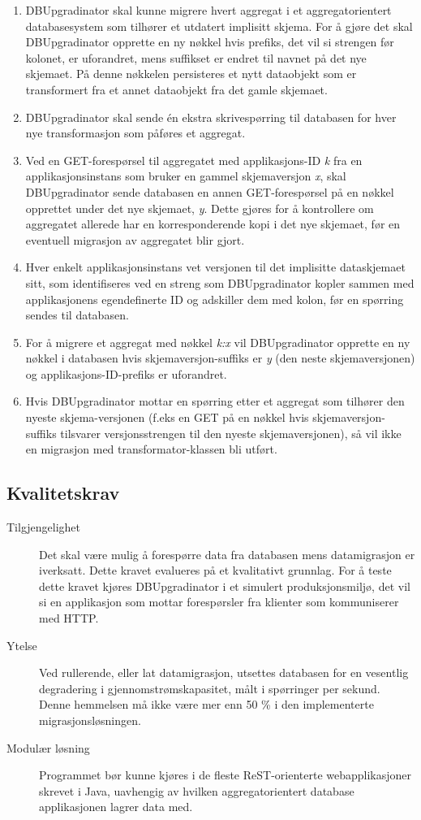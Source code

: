 \begin{enumerate}
  \item DBUpgradinator skal kunne migrere hvert aggregat i et aggregatorientert databasesystem som tilhører et utdatert implisitt skjema. For å gjøre det skal DBUpgradinator opprette en ny nøkkel hvis prefiks, det vil si strengen før kolonet, er uforandret, mens suffikset er endret til navnet på det nye skjemaet. På denne nøkkelen persisteres et nytt dataobjekt som er transformert fra et annet dataobjekt fra det gamle skjemaet.
  \item DBUpgradinator skal sende én ekstra skrivespørring til databasen for hver nye transformasjon som påføres et aggregat.
  \item Ved en GET-forespørsel til aggregatet med applikasjons-ID \emph{k} fra en applikasjonsinstans som bruker en gammel skjemaversjon \emph{x}, skal DBUpgradinator sende databasen en annen GET-forespørsel på en nøkkel opprettet under det nye skjemaet, \emph{y}. Dette gjøres for å kontrollere om aggregatet allerede har en korresponderende kopi i det nye skjemaet, før en eventuell migrasjon av aggregatet blir gjort.
  \item Hver enkelt applikasjonsinstans vet versjonen til det implisitte dataskjemaet sitt, som identifiseres ved en streng som DBUpgradinator kopler sammen med applikasjonens egendefinerte ID og adskiller dem med kolon, før en spørring sendes til databasen.
  \item For å migrere et aggregat med nøkkel \emph{k:x} vil DBUpgradinator opprette en ny nøkkel i databasen hvis skjemaversjon-suffiks er \emph{y} (den neste skjemaversjonen) og applikasjons-ID-prefiks er uforandret.
  \item Hvis DBUpgradinator mottar en spørring etter et aggregat som tilhører den nyeste skjema-versjonen (f.eks en GET på en nøkkel hvis skjemaversjon-suffiks tilsvarer versjonsstrengen til den nyeste skjemaversjonen), så vil ikke en migrasjon med transformator-klassen bli utført.
\end{enumerate}

\subsection{Kvalitetskrav}

\begin{description}
  \item[Tilgjengelighet] Det skal være mulig å forespørre data fra databasen mens datamigrasjon er iverksatt. Dette kravet evalueres på et kvalitativt grunnlag. For å teste dette kravet kjøres DBUpgradinator i et simulert produksjonsmiljø, det vil si en applikasjon som mottar forespørsler fra klienter som kommuniserer med HTTP.
  \item[Ytelse] Ved rullerende, eller lat datamigrasjon, utsettes databasen for en vesentlig degradering i gjennomstrømskapasitet, målt i spørringer per sekund. Denne hemmelsen må ikke være mer enn 50 \% i den implementerte migrasjonsløsningen.
  \item[Modulær løsning] Programmet bør kunne kjøres i de fleste ReST-orienterte webapplikasjoner skrevet i Java, uavhengig av hvilken aggregatorientert database applikasjonen lagrer data med.
\end{description}
